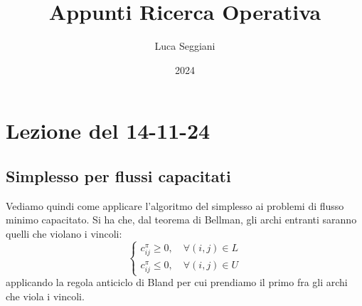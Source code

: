 \documentclass[a4paper,11pt]{article}
\title{Appunti Ricerca Operativa}
\author{Luca Seggiani}
\date{2024}
\begin{document}
\section{Lezione del 14-11-24}

\thispagestyle{empty}
\pagestyle{fancy}

\subsection{Simplesso per flussi capacitati}
Vediamo quindi come applicare l'algoritmo del simplesso ai problemi di flusso minimo capacitato.
Si ha che, dal teorema di Bellman, gli archi entranti saranno quelli che violano i vincoli:
\[
	\begin{cases}
		c_{ij}^\pi \geq 0, \quad \forall (i, j) \in L \\ 
		c_{ij}^\pi \leq 0, \quad \forall (i, j) \in U
	\end{cases}
\]
applicando la regola anticiclo di Bland per cui prendiamo il primo fra gli archi che viola i vincoli.
\end{document}
